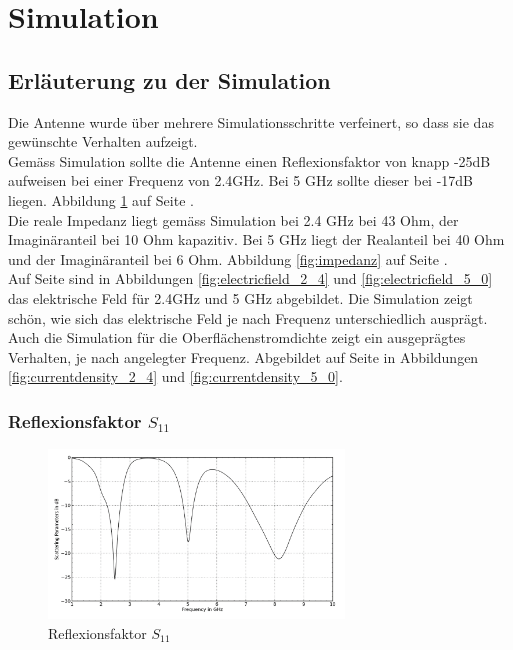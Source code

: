 \newpage
\section{Simulation}

\subsection{Erläuterung zu der Simulation}
Die Antenne wurde über mehrere Simulationsschritte verfeinert, so dass sie das gewünschte Verhalten aufzeigt.\\ 
Gemäss Simulation sollte die Antenne einen Reflexionsfaktor von knapp -25dB aufweisen bei einer Frequenz von 2.4GHz. Bei 5 GHz sollte dieser bei -17dB liegen. Abbildung \ref{fig:reflexionsfaktor} auf Seite \pageref{fig:reflexionsfaktor}.\\
Die reale Impedanz liegt gemäss Simulation bei 2.4 GHz bei 43 Ohm, der Imaginäranteil bei 10 Ohm kapazitiv. Bei 5 GHz liegt der Realanteil bei 40 Ohm und der Imaginäranteil bei 6 Ohm. Abbildung \ref{fig:impedanz} auf Seite \pageref{fig:impedanz}.\\
Auf Seite \pageref{fig:electricfield} sind in Abbildungen \ref{fig:electricfield_2_4} und \ref{fig:electricfield_5_0} das elektrische Feld für 2.4GHz und 5 GHz abgebildet. Die Simulation zeigt schön, wie sich das elektrische Feld je nach Frequenz unterschiedlich ausprägt.\\
Auch die Simulation für die Oberflächenstromdichte zeigt ein ausgeprägtes Verhalten, je nach angelegter Frequenz. Abgebildet auf Seite \pageref{fig:currentdensity} in Abbildungen \ref{fig:currentdensity_2_4} und \ref{fig:currentdensity_5_0}.


\clearpage
\subsubsection{Reflexionsfaktor $S_{11}$}
\begin{figure}[h!]
	\centering
	\includegraphics[width=0.7\textwidth]{../fig/plt/crazy_stuff_l4_pcb_v2c_laptop_1a_105_S11_2.png}
	\caption{Reflexionsfaktor $S_{11}$}
	\label{fig:reflexionsfaktor}
\end{figure}

